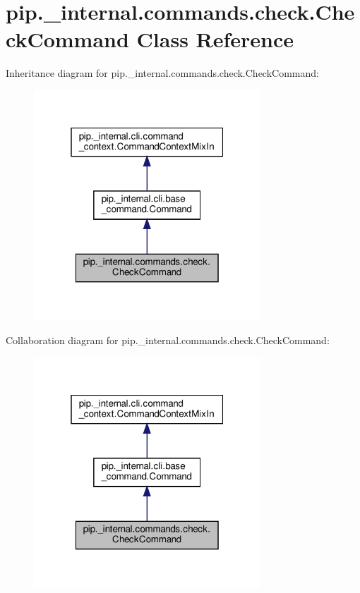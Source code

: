 \hypertarget{classpip_1_1__internal_1_1commands_1_1check_1_1CheckCommand}{}\section{pip.\+\_\+internal.\+commands.\+check.\+Check\+Command Class Reference}
\label{classpip_1_1__internal_1_1commands_1_1check_1_1CheckCommand}


Inheritance diagram for pip.\+\_\+internal.\+commands.\+check.\+Check\+Command\+:
\nopagebreak
\begin{figure}[H]
\begin{center}
\leavevmode
\includegraphics[width=241pt]{classpip_1_1__internal_1_1commands_1_1check_1_1CheckCommand__inherit__graph}
\end{center}
\end{figure}


Collaboration diagram for pip.\+\_\+internal.\+commands.\+check.\+Check\+Command\+:
\nopagebreak
\begin{figure}[H]
\begin{center}
\leavevmode
\includegraphics[width=241pt]{classpip_1_1__internal_1_1commands_1_1check_1_1CheckCommand__coll__graph}
\end{center}
\end{figure}
